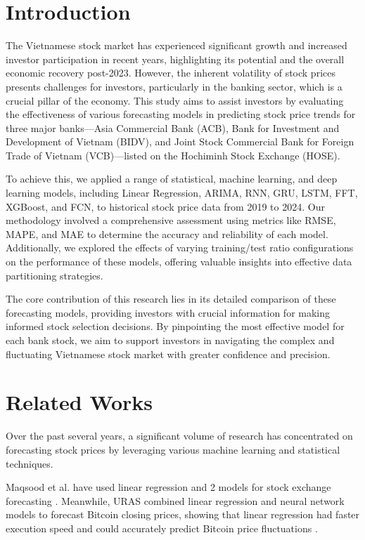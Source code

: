 \documentclass{ieeeojies}
\begin{document}
\section{Introduction}%
The Vietnamese stock market has experienced significant growth and increased investor participation in recent years, highlighting its potential and the overall economic recovery post-2023. However, the inherent volatility of stock prices presents challenges for investors, particularly in the banking sector, which is a crucial pillar of the economy. This study aims to assist investors by evaluating the effectiveness of various forecasting models in predicting stock price trends for three major banks—Asia Commercial Bank (ACB), Bank for Investment and Development of Vietnam (BIDV), and Joint Stock Commercial Bank for Foreign Trade of Vietnam (VCB)—listed on the Hochiminh Stock Exchange (HOSE).

To achieve this, we applied a range of statistical, machine learning, and deep learning models, including Linear Regression, ARIMA, RNN, GRU, LSTM, FFT, XGBoost, and FCN, to historical stock price data from 2019 to 2024. Our methodology involved a comprehensive assessment using metrics like RMSE, MAPE, and MAE to determine the accuracy and reliability of each model. Additionally, we explored the effects of varying training/test ratio configurations on the performance of these models, offering valuable insights into effective data partitioning strategies.

The core contribution of this research lies in its detailed comparison of these forecasting models, providing investors with crucial information for making informed stock selection decisions. By pinpointing the most effective model for each bank stock, we aim to support investors in navigating the complex and fluctuating Vietnamese stock market with greater confidence and precision.
\section{Related Works}
Over the past several years, a significant volume of research has concentrated on forecasting stock prices by leveraging various machine learning and statistical techniques.

Maqsood et al. have used linear regression and 2 models for stock exchange forecasting \cite{cakra2015stock}. Meanwhile, URAS combined linear regression and neural network models to forecast Bitcoin closing prices, showing that linear regression had faster execution speed and could accurately predict Bitcoin price fluctuations \cite{uras2020forecasting}.
\end{document}
